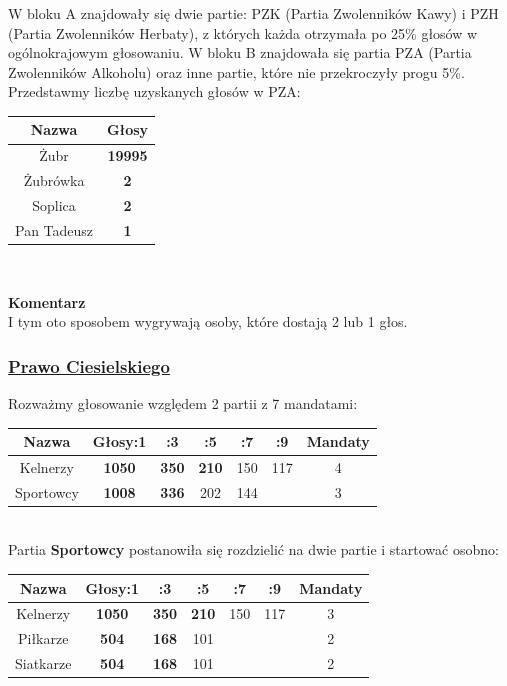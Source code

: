 \documentclass[12pt,a4paper]{article}
\theoremstyle{break}
\newcommand{\Komentarz}[1]{
	\begin{mdframed}[style=zadanie]
		\textbf{Komentarz}\\
		#1
	\end{mdframed}
	}
\begin{document}
W bloku A znajdowały się dwie partie: PZK (Partia Zwolenników Kawy) i PZH (Partia Zwolenników Herbaty), z których każda otrzymała po 25\% głosów w ogólnokrajowym głosowaniu. W bloku B znajdowała się partia PZA (Partia Zwolenników Alkoholu) oraz inne partie, które nie przekroczyły progu 5\%. Przedstawmy liczbę uzyskanych głosów w PZA:

\begin{tabular}{|c|c|}\hline
	Nazwa       & Głosy\\\hline
	Żubr        & \textbf{19995}\\\hline
	Żubrówka    & \textbf{2}\\\hline
	Soplica     & \textbf{2}\\\hline
	Pan Tadeusz & \textbf{1}\\\hline
\end{tabular}\\

\Komentarz{I tym oto sposobem wygrywają osoby, które dostają 2 lub 1 głos.}

\subsubsection{\href{http://www.racjonalista.pl/kk.php/s,9848/k,3}{Prawo Ciesielskiego}}

Rozważmy głosowanie względem 2 partii z 7 mandatami:

\begin{tabular}{|c|c|c|c|c|c|c|}\hline
	Nazwa        & Głosy:1 & :3 & :5  & :7  & :9  & Mandaty\\\hline
	Kelnerzy     & \textbf{1050} & \textbf{350} & \textbf{210} & 150 & 117  & 4\\\hline
	Sportowcy    & \textbf{1008} & \textbf{336} & 202  & 144 &      & 3\\\hline
\end{tabular}\\

Partia \textbf{Sportowcy} postanowiła się rozdzielić na dwie partie i startować osobno:

\begin{tabular}{|c|c|c|c|c|c|c|}\hline
	Nazwa        & Głosy:1 & :3 & :5  & :7  & :9  & Mandaty\\\hline
	Kelnerzy     & \textbf{1050} & \textbf{350} & \textbf{210} & 150 & 117  & 3\\\hline
	Piłkarze     & \textbf{504}  & \textbf{168} & 101  &     &      & 2\\\hline
	Siatkarze    & \textbf{504}  & \textbf{168} & 101  &     &      & 2\\\hline
\end{tabular}\\
\end{document}
